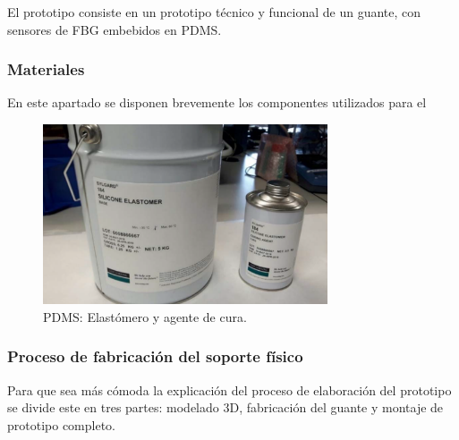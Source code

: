 El prototipo consiste en un prototipo técnico y funcional de un guante, con sensores de FBG embebidos en PDMS. 
 
\subsubsection{Materiales}
En este apartado se disponen brevemente los componentes utilizados para el 
\begin{figure}[H]
	\centering
	\includegraphics[width=0.75\textwidth]{./img/PDMS}
	\caption{PDMS: Elastómero y agente de cura.} \label{fig:pdms}
\end{figure}



\subsubsection{Proceso de fabricación del soporte físico}
Para que sea más cómoda la explicación del proceso de elaboración del prototipo se divide este en tres partes: modelado 3D, fabricación del guante y montaje de prototipo completo.

